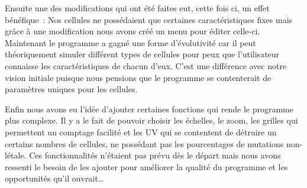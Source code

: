 Ensuite une des modifications qui ont été faites eut, cette fois ci, un effet bénéfique : Nos cellules ne possédaient que certaines caractéristiques fixes mais grâce à une modification nous avons créé un menu pour éditer celle-ci. Maintenant le programme a gagné une forme d’évolutivité car il peut théoriquement simuler différent types de cellules pour peux que l’utilisateur connaisse les caractéristiques de chacun d’eux. C’est une différence avec notre vision initiale puisque nous pensions que le programme se contenterait de paramètres uniques pour les cellules.

Enfin nous avons eu l’idée d’ajouter certaines fonctions qui rende le programme plus complexe. Il y a le fait de pouvoir choisir les échelles, le zoom, les grilles qui permettent un comptage facilité et les UV qui se contentent de détruire un certains nombres de cellules, ne possédant pas les pourcentages de mutations non-létale. Ces fonctionnalités n’étaient pas prévu dès le départ mais nous avons ressenti le besoin de les ajouter pour améliorer la qualité du programme et les opportunités qu’il ouvrait…
